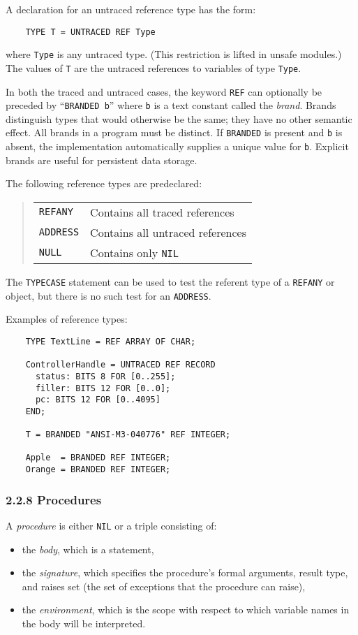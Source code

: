 \documentclass[10pt]{article}
\begin{document}
A declaration for an untraced reference type has the form:
\begin{verbatim}
    TYPE T = UNTRACED REF Type
\end{verbatim}
where \verb|Type| is any untraced type.  (This restriction is lifted in unsafe
modules.) The values of \verb|T| are the untraced references to variables of
type \verb|Type|.

In both the traced and untraced cases, the keyword \verb|REF| can optionally
be preceded by ``\verb|BRANDED b|'' where \verb|b| is a text constant called
the \emph{brand}.  Brands distinguish types that would otherwise be the same;
they have no other semantic effect.  All brands in a program must be distinct.
If \verb|BRANDED| is present and \verb|b| is absent, the implementation
automatically supplies a unique value for \verb|b|.  Explicit brands are
useful for persistent data storage.

The following reference types are predeclared:
\begin{quote}
  \begin{tabular}{ll}
    \verb|REFANY|  & Contains all traced references \\
    \verb|ADDRESS| & Contains all untraced references \\
    \verb|NULL|    & Contains only \verb|NIL| \\
  \end{tabular}
\end{quote}
The \verb|TYPECASE| statement can be used to test the referent type of a
\verb|REFANY| or object, but there is no such test for an \verb|ADDRESS|.

Examples of reference types:
\begin{verbatim}
    TYPE TextLine = REF ARRAY OF CHAR;

    ControllerHandle = UNTRACED REF RECORD
      status: BITS 8 FOR [0..255];
      filler: BITS 12 FOR [0..0];
      pc: BITS 12 FOR [0..4095]
    END;

    T = BRANDED "ANSI-M3-040776" REF INTEGER;

    Apple  = BRANDED REF INTEGER;
    Orange = BRANDED REF INTEGER;
\end{verbatim}

\subsubsection*{2.2.8 Procedures}

A \emph{procedure} is either \verb|NIL| or a triple consisting of:
\begin{itemize}
\item the \emph{body}, which is a statement,
\item the \emph{signature}, which specifies the procedure's formal arguments,
  result type, and raises set (the set of exceptions that the procedure can
  raise),
\item the \emph{environment}, which is the scope with respect to which
  variable names in the body will be interpreted.
\end{itemize}
\end{document}

